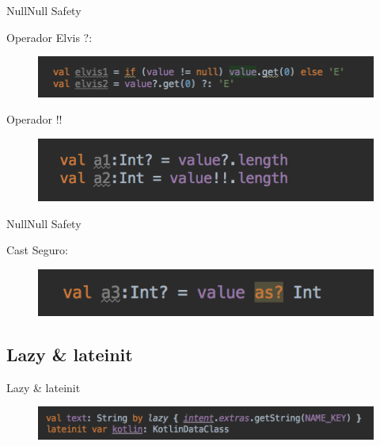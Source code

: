\begin{frame}{Null}{Null Safety}
  \begin{block}{Operador Elvis ?:}
    \begin{figure}[h]
    \centering
    \includegraphics[width=\textwidth]{images/kotlin_vs_java/null_5}
    \end{figure}
  \end{block}
  \begin{block}{Operador !!}
    \begin{figure}[h]
    \centering
    \includegraphics[width=\textwidth]{images/kotlin_vs_java/null_6}
    \end{figure}
  \end{block}
\end{frame}

\begin{frame}{Null}{Null Safety}
  \begin{block}{Cast Seguro:}
    \begin{figure}[h]
    \centering
    \includegraphics[width=\textwidth]{images/kotlin_vs_java/null_7}
    \end{figure}
  \end{block}
\end{frame}

\subsection{Lazy \& lateinit}
\begin{frame}{Lazy \& lateinit}{}
    \begin{figure}[h]
    \centering
    \includegraphics[width=\textwidth]{images/kotlin_vs_java/lateinit_lazy}
    \end{figure}
\end{frame}

